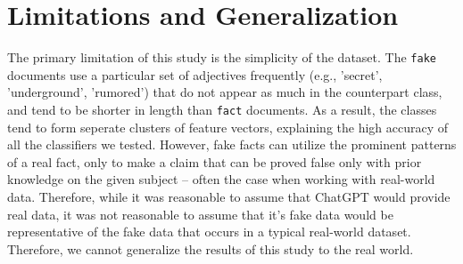 \documentclass[11pt]{article}
\begin{document}
\section{Limitations and Generalization}
The primary limitation of this study is the simplicity of the dataset.
The \texttt{fake} documents use a particular set of adjectives 
frequently (e.g., 'secret', 'underground', 'rumored')
that do not appear as much in the counterpart class, and
tend to be shorter in length than \texttt{fact} documents.
As a result, the classes tend to form seperate clusters of feature vectors,
explaining the high accuracy of all the classifiers we tested. However,
fake facts can utilize the prominent patterns
of a real fact, only to make a claim that can be proved 
false only with prior knowledge on the given subject – often the case when working with real-world data.
Therefore, while it was reasonable to assume that ChatGPT would provide real data,
it was not reasonable to assume that it's fake data would be representative of the fake
data that occurs in a typical real-world dataset. Therefore, we cannot generalize the results of this study to the real world.
\end{document}
